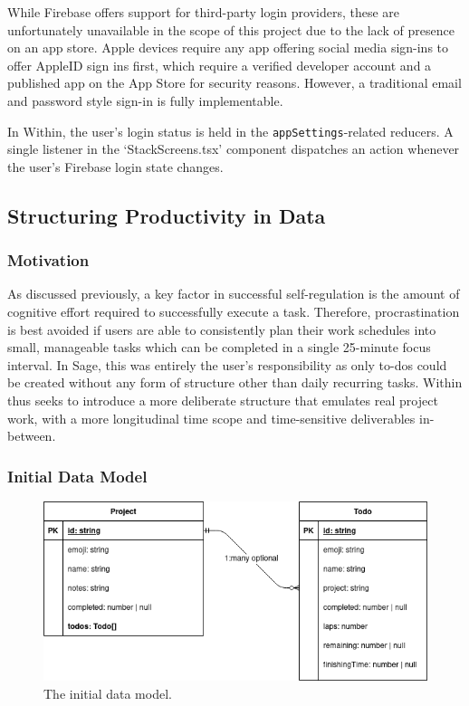 While Firebase offers support for third-party login providers, these are unfortunately unavailable in the scope of this project due to the lack of presence on an app store. Apple devices require any app offering social media sign-ins to offer AppleID sign ins first, which require a verified developer account and a published app on the App Store for security reasons. However, a traditional email and password style sign-in is fully implementable.

In Within, the user's login status is held in the \texttt{appSettings}-related reducers. A single listener in the `StackScreens.tsx' component dispatches an action whenever the user's Firebase login state changes.


\subsection{Structuring Productivity in Data}
\subsubsection{Motivation}
As discussed previously, a key factor in successful self-regulation is the amount of cognitive effort required to successfully execute a task. Therefore, procrastination is best avoided if users are able to consistently plan their work schedules into small, manageable tasks which can be completed in a single 25-minute focus interval. In Sage, this was entirely the user's responsibility as only to-dos could be created without any form of structure other than daily recurring tasks. Within thus seeks to introduce a more deliberate structure that emulates real project work, with a more longitudinal time scope and time-sensitive deliverables in-between.

\subsubsection{Initial Data Model}
\begin{figure}[h]
    \begin{center}
        \includegraphics[scale=0.5]{images/initial_data_model.png}
    \end{center}
    \caption{The initial data model.}
    \label{fig:initial_data_model}
\end{figure}

